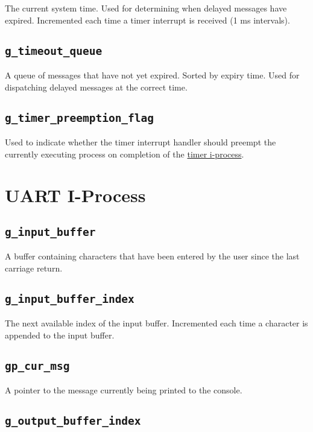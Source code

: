 \documentclass[12pt]{report}
\begin{document}
The current system time. Used for determining when delayed messages have expired. Incremented each time a timer interrupt is received (1 ms intervals).

\subsection{\texttt{g_timeout_queue}}
\label{app:gtimeoutqueue}

A queue of messages that have not yet expired. Sorted by expiry time. Used for dispatching delayed messages at the correct time.

\subsection{\texttt{g_timer_preemption_flag}}

Used to indicate whether the timer interrupt handler should preempt the currently executing process on completion of the \hyperref[subsec:Timer I-Process]{timer i-process}.

\section{UART I-Process}
\label{app:uartglobals}

\subsection{\texttt{g_input_buffer}}

A buffer containing characters that have been entered by the user since the last carriage return.

\subsection{\texttt{g_input_buffer_index}}

The next available index of the input buffer. Incremented each time a character is appended to the input buffer. 

\subsection{\texttt{gp_cur_msg}}

A pointer to the message currently being printed to the console.

\subsection{\texttt{g_output_buffer_index}}
\end{document}
